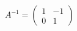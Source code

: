 \documentclass[preview]{standalone}
\begin{document}
\begin{align*}
A^{-1} = \begin{pmatrix} 1 & -1 \\ 0 & 1 \end{pmatrix}
\end{align*}
\end{document}
